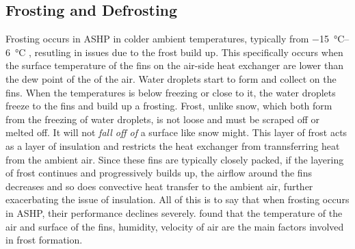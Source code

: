 \subsection{Frosting and Defrosting}
Frosting occurs in \acs{ASHP} in colder ambient temperatures, typically from \qtyrange{-15}{6}{\celsius} \cite{sandstrom_frosting_2021}, resutling in issues due to the frost build up. This specifically occurs when the surface temperature of the fins on the air-side heat exchanger are lower than the dew point of the of the air. Water droplets start to form and collect on the fins. When the temperatures is below freezing or close to it, the water droplets freeze to the fins and build up a frosting. Frost, unlike snow, which both form from the freezing of water droplets, is not loose and must be scraped off or melted off. It will not \textit{fall off of} a surface like snow might. This layer of frost acts as a layer of insulation and restricts the heat exchanger from trannsferring heat from the ambient air. Since these fins are typically closely packed, if the layering of frost continues and progressively builds up, the airflow around the fins decreases and so does convective heat transfer to the ambient air, further exacerbating the issue of insulation. All of this is to say that when frosting occurs in \acs{ASHP}, their performance declines severely. \cite{zhang_experimental_2018} found that the temperature of the air and surface of the fins, humidity, velocity of air are the main factors involved in frost formation. 

